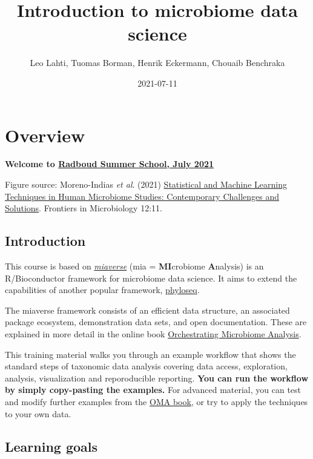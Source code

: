 \documentclass[
  oneside]{book}
\title{Introduction to microbiome data science}
\author{Leo Lahti, Tuomas Borman, Henrik Eckermann, Chouaib Benchraka}
\date{2021-07-11}
\begin{document}
\maketitle

{
\setcounter{tocdepth}{1}
\tableofcontents
}
\hypertarget{overview}{%
\chapter{Overview}\label{overview}}

\textbf{Welcome to \href{https://www.ru.nl/radboudsummerschool/courses/2021/brain-bacteria-behaviour/}{Radboud Summer School, July 2021}}

Figure source: Moreno-Indias \emph{et al}. (2021) \href{https://doi.org/10.3389/fmicb.2021.635781}{Statistical and Machine Learning Techniques in Human Microbiome Studies: Contemporary Challenges and Solutions}. Frontiers in Microbiology 12:11.

\hypertarget{introduction}{%
\section{Introduction}\label{introduction}}

This course is based on \href{https://microbiome.github.io}{\emph{miaverse}} (mia = \textbf{MI}crobiome \textbf{A}nalysis) is an
R/Bioconductor framework for microbiome data science. It aims to
extend the capabilities of another popular framework,
\href{https://joey711.github.io/phyloseq/}{phyloseq}.

The miaverse framework consists of an efficient data structure, an
associated package ecosystem, demonstration data sets, and open
documentation. These are explained in more detail in the online book
\href{https://microbiome.github.io/OMA}{Orchestrating Microbiome Analysis}.

This training material walks you through an example workflow that
shows the standard steps of taxonomic data analysis covering data
access, exploration, analysis, visualization and reporoducible
reporting. \textbf{You can run the workflow by simply copy-pasting the
examples.} For advanced material, you can test and modify further
examples from the \href{https://microbiome.github.io/OMA}{OMA book}, or try
to apply the techniques to your own data.

\hypertarget{learning-goals}{%
\section{Learning goals}\label{learning-goals}}
\end{document}
